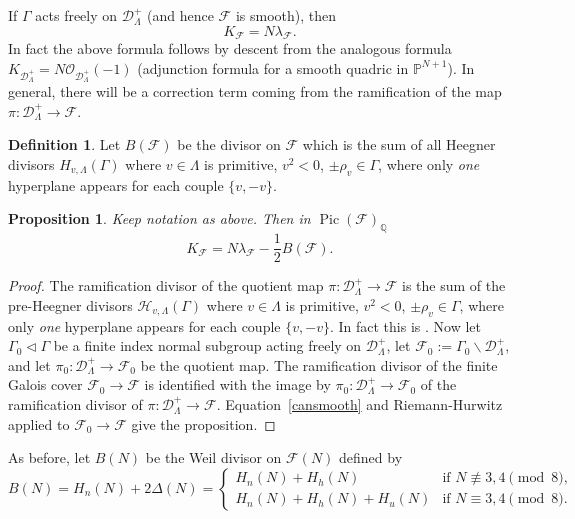 \documentclass[11pt]{amsart}
\numberwithin{equation}{subsection}
\theoremstyle{plain}
\newtheorem{proposition}[theorem]{Proposition}
\theoremstyle{remark}
\theoremstyle{definition}
\newtheorem{definition}[theorem]{Definition}
\def\Pic{\operatorname{Pic}}
\newcommand{\sF}{\mathscr{F}}
\newcommand{\sD}{\mathscr{D}}
\newcommand{\cD}{{\mathscr D}}
\newcommand{\cF}{{\mathscr F}}
\newcommand{\cH}{{\mathscr H}}
\newcommand{\cO}{{\mathscr O}}
\newcommand{\PP}{{\mathbb P}}
\newcommand{\QQ}{{\mathbb Q}}
\begin{document}
 If $\Gamma$ acts freely on $\sD^{+}_{\Lambda}$ (and hence $\sF$  is smooth), then 
%
\begin{equation}\label{cansmooth}
%
K_{\cF}=N\lambda_{\cF}.
%
\end{equation}
%
In fact the above formula follows by descent from the analogous formula  $K_{\cD^{+}_{\Lambda}}=N\cO_{\cD^{+}_{\Lambda}}(-1)$ (adjunction formula for a smooth quadric in $\PP^{N+1}$). In general, there will be a correction term  coming from the ramification of the map $\pi\colon\cD^{+}_{\Lambda}\to \cF$.  
%
\begin{definition}
%
Let $B(\cF)$ be the divisor on $\cF$ which is the sum of all Heegner divisors  $H_{v,\Lambda}(\Gamma)$ 
 where  $v\in\Lambda$ is primitive, $v^2<0$, $\pm\rho_v\in\Gamma$, where only  \emph{one} hyperplane appears for  each couple $\{v,-v\}$. 
%
\end{definition}
%
%
\begin{proposition}\label{prp:propriemhur}
%
Keep notation as above.  
Then  in $\Pic(\cF)_{\QQ}$
%
\begin{equation}\label{canoneffe}
%
K_{\cF}=N\lambda_{\cF}-\frac{1}{2}B(\cF).
%
\end{equation}
%
%
\end{proposition}
%
%
\begin{proof}
%
The ramification  divisor of the quotient map $\pi\colon\cD^{+}_{\Lambda}\to \cF$ is the sum  of the pre-Heegner divisors $\cH_{v,\Lambda}(\Gamma)$ 
 where  $v\in\Lambda$ is primitive, $v^2<0$, $\pm\rho_v\in\Gamma$, where only  \emph{one} hyperplane appears for  each couple $\{v,-v\}$. 
 In fact this is \cite[Cor.~2.13]{ghs}. Now let $\Gamma_0\triangleleft\Gamma$ be a finite index  normal subgroup acting freely on $\cD^{+}_{\Lambda}$, let $\cF_0:=\Gamma_0\backslash\cD^{+}_{\Lambda}$, and let $\pi_0\colon\cD^{+}_{\Lambda}\to \cF_0$ be the quotient map. The ramification divisor of the finite Galois cover 
 $\cF_0\to \cF$ is identified with the image by $\pi_0\colon\cD^{+}_{\Lambda}\to \cF_0$ of the ramification  divisor of  $\pi\colon\cD^{+}_{\Lambda}\to \cF$.  
Equation~\eqref{cansmooth} and Riemann-Hurwitz applied to  $\cF_0\to \cF$ give the proposition.  
%
\end{proof}
%
As before, let $B(N)$ be the Weil divisor on $\cF(N)$ defined by
\begin{equation}\label{branchen}
%
B(N)=H_n(N)+2\Delta(N)= \begin{cases}
%
H_n(N)+H_h(N) & \text{if $N\not\equiv 3,4\pmod{8}$,}\\
%
H_n(N)+H_h(N) +H_u(N) & \text{if $N\equiv 3,4\pmod{8}$.}
%
\end{cases}
%
%
\end{equation}
\end{document}
